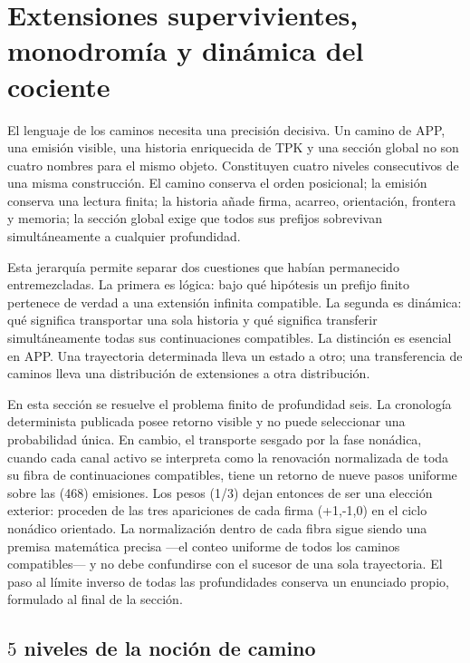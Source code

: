 \chapter{Extensiones supervivientes, monodromía y dinámica del cociente}
\label{chap:extensiones-dinamica-cociente}

El lenguaje de los caminos necesita una precisión decisiva. Un camino de
APP, una emisión visible, una historia enriquecida de TPK y una sección
global no son cuatro nombres para el mismo objeto. Constituyen cuatro niveles
consecutivos de una misma construcción. El camino conserva el orden
posicional; la emisión conserva una lectura finita; la historia añade firma,
acarreo, orientación, frontera y memoria; la sección global exige que todos
sus prefijos sobrevivan simultáneamente a cualquier profundidad.

Esta jerarquía permite separar dos cuestiones que habían permanecido
entremezcladas. La primera es lógica: bajo qué hipótesis un prefijo finito
pertenece de verdad a una extensión infinita compatible. La segunda es
dinámica: qué significa transportar una sola historia y qué significa
transferir simultáneamente todas sus continuaciones compatibles. La
distinción es esencial en APP\@. Una trayectoria determinada lleva un estado a
otro; una transferencia de caminos lleva una distribución de extensiones a
otra distribución.

En esta sección se resuelve el problema finito de profundidad seis. La
cronología determinista publicada posee retorno visible y no puede seleccionar
una probabilidad única. En cambio, el transporte sesgado por la fase nonádica,
cuando cada canal activo se interpreta como la renovación normalizada de toda
su fibra de continuaciones compatibles, tiene un retorno de nueve pasos
uniforme sobre las (468) emisiones. Los pesos (1/3) dejan entonces de ser
una elección exterior: proceden de las tres apariciones de cada firma
(+1,-1,0) en el ciclo nonádico orientado. La normalización dentro de cada fibra sigue
siendo una premisa matemática precisa ---el conteo uniforme de todos los
caminos compatibles--- y no debe confundirse con el sucesor de una sola
trayectoria. El paso al límite inverso de todas las profundidades conserva un
enunciado propio, formulado al final de la sección.

\section{\(5\) niveles de la noción de camino}

